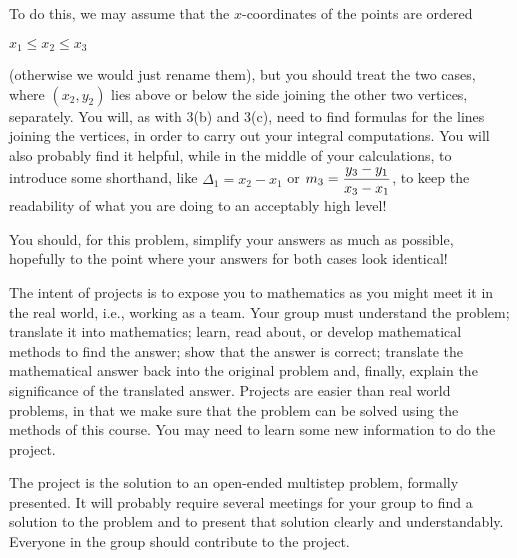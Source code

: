 \medskip

To do this, we may assume that the $x$-coordinates of the points are 
ordered 

\smallskip

\centerline{$x_1 \leq x_2 \leq x_3$}

\smallskip

\noindent (otherwise we would just rename them), but you 
should treat the two cases, where $(x_2,y_2)$ lies above or below the 
side joining the other two vertices, separately. You will, as with 3(b) 
and 3(c), need to find formulas for the lines joining the vertices, in
order to carry out your integral computations. You will also probably find it
helpful, while in the middle of your calculations, to introduce some shorthand,
like $\Delta_1=x_2-x_1$ or $\displaystyle m_3={{y_3-y_1}\over{x_3-x_1}}$, to keep the
readability of what you are doing to an acceptably high level!

\smallskip

You should, for this problem, simplify your answers as much as possible,
hopefully to the point where your answers for both cases look identical!

\bigskip


\medskip

The intent of projects is to expose you to mathematics as you might meet it 
in the real world, i.e., working
as a team. Your group must understand the problem; translate it into 
mathematics; learn, read about, or
develop mathematical methods to find the answer; show that the answer is 
correct; translate the mathematical
answer back into the original problem and, finally, explain the significance 
of the translated answer. Projects
are easier than real world problems, in that we make sure that the problem 
can be solved using the methods
of this course. You may need to learn some new information to do the project.

\medskip

The project is the solution to an open-ended multistep problem, formally 
presented. It will
probably require several meetings for your group to find a solution to the 
problem and to present that solution
clearly and understandably. Everyone in the group should contribute to the project.
\medskip


